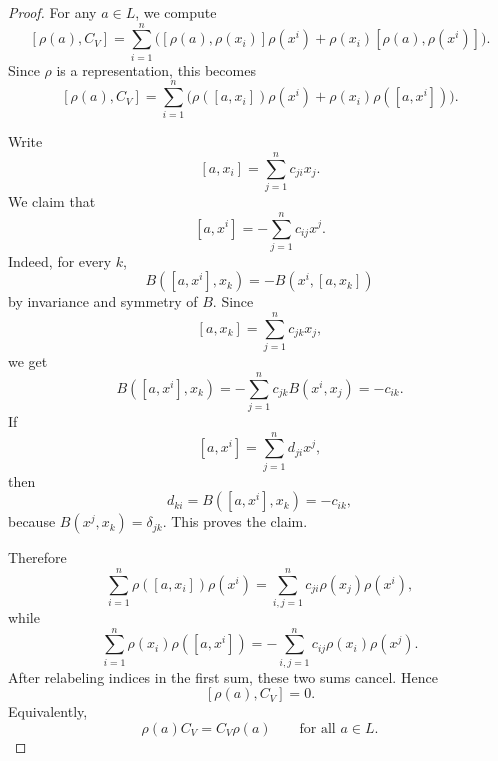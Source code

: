 \begin{proof}
    For any $a\in L$, we compute
    \[
        [\rho(a),C_V]
        =
        \sum_{i=1}^n \bigl([\rho(a),\rho(x_i)]\rho(x^i)+\rho(x_i)[\rho(a),\rho(x^i)]\bigr).
    \]
    Since $\rho$ is a representation, this becomes
    \[
        [\rho(a),C_V]
        =
        \sum_{i=1}^n \bigl(\rho([a,x_i])\rho(x^i)+\rho(x_i)\rho([a,x^i])\bigr).
    \]

    Write
    \[
        [a,x_i]=\sum_{j=1}^n c_{ji}x_j.
    \]
    We claim that
    \[
        [a,x^i]=-\sum_{j=1}^n c_{ij}x^j.
    \]
    Indeed, for every $k$,
    \[
        B([a,x^i],x_k)=-B(x^i,[a,x_k])
    \]
    by invariance and symmetry of $B$. Since
    \[
        [a,x_k]=\sum_{j=1}^n c_{jk}x_j,
    \]
    we get
    \[
        B([a,x^i],x_k)
        =
        -\sum_{j=1}^n c_{jk}B(x^i,x_j)
        =
        -c_{ik}.
    \]
    If
    \[
        [a,x^i]=\sum_{j=1}^n d_{ji}x^j,
    \]
    then
    \[
        d_{ki}=B([a,x^i],x_k)=-c_{ik},
    \]
    because $B(x^j,x_k)=\delta_{jk}$. This proves the claim.

    Therefore
    \[
        \sum_{i=1}^n \rho([a,x_i])\rho(x^i)
        =
        \sum_{i,j=1}^n c_{ji}\rho(x_j)\rho(x^i),
    \]
    while
    \[
        \sum_{i=1}^n \rho(x_i)\rho([a,x^i])
        =
        -\sum_{i,j=1}^n c_{ij}\rho(x_i)\rho(x^j).
    \]
    After relabeling indices in the first sum, these two sums cancel. Hence
    \[
        [\rho(a),C_V]=0.
    \]
    Equivalently,
    \[
        \rho(a)C_V=C_V\rho(a)
        \qquad\text{for all } a\in L.
    \]
\end{proof}

